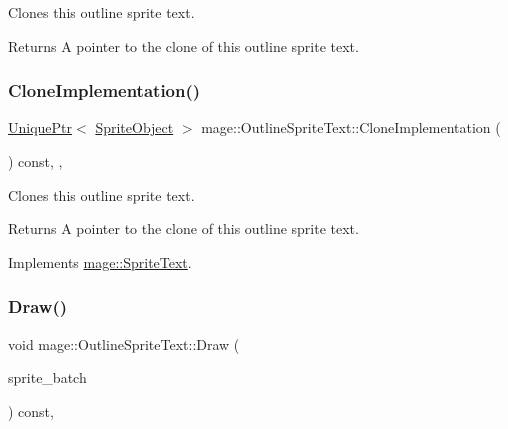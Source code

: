 Clones this outline sprite text.

\begin{DoxyReturn}{Returns}
A pointer to the clone of this outline sprite text. 
\end{DoxyReturn}
\hypertarget{classmage_1_1_outline_sprite_text_af8d29408abb61c05a23499bf37c4c7b0}{}\label{classmage_1_1_outline_sprite_text_af8d29408abb61c05a23499bf37c4c7b0} 
\subsubsection{\texorpdfstring{Clone\+Implementation()}{CloneImplementation()}}
{\footnotesize\ttfamily \hyperlink{namespacemage_a8c307fbcc33bce9b7f2aa4c26c3b95cf}{Unique\+Ptr}$<$ \hyperlink{classmage_1_1_sprite_object}{Sprite\+Object} $>$ mage\+::\+Outline\+Sprite\+Text\+::\+Clone\+Implementation (\begin{DoxyParamCaption}{ }\end{DoxyParamCaption}) const\hspace{0.3cm}{\ttfamily [override]}, {\ttfamily [private]}, {\ttfamily [virtual]}}

Clones this outline sprite text.

\begin{DoxyReturn}{Returns}
A pointer to the clone of this outline sprite text. 
\end{DoxyReturn}


Implements \hyperlink{classmage_1_1_sprite_text_a2b9f59a1730f8b9691f173251a2b4944}{mage\+::\+Sprite\+Text}.

\hypertarget{classmage_1_1_outline_sprite_text_a524e9ad1caeeeaa32405e61d1a5e1032}{}\label{classmage_1_1_outline_sprite_text_a524e9ad1caeeeaa32405e61d1a5e1032} 
\subsubsection{\texorpdfstring{Draw()}{Draw()}}
{\footnotesize\ttfamily void mage\+::\+Outline\+Sprite\+Text\+::\+Draw (\begin{DoxyParamCaption}\item[{Sprite\+Batch \&}]{sprite\+\_\+batch }\end{DoxyParamCaption}) const\hspace{0.3cm}{\ttfamily [override]}, {\ttfamily [virtual]}}

